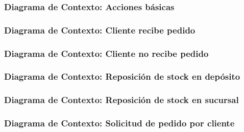 \subsubsection{Diagrama de Contexto: Acciones básicas}

\clearpage
\subsubsection{Diagrama de Contexto: Cliente recibe pedido}

\clearpage
\subsubsection{Diagrama de Contexto: Cliente no recibe pedido}

\clearpage
\subsubsection{Diagrama de Contexto: Reposición de stock en depósito}

\clearpage
\subsubsection{Diagrama de Contexto: Reposición de stock en sucursal}

\clearpage
\subsubsection{Diagrama de Contexto: Solicitud de pedido por cliente}
